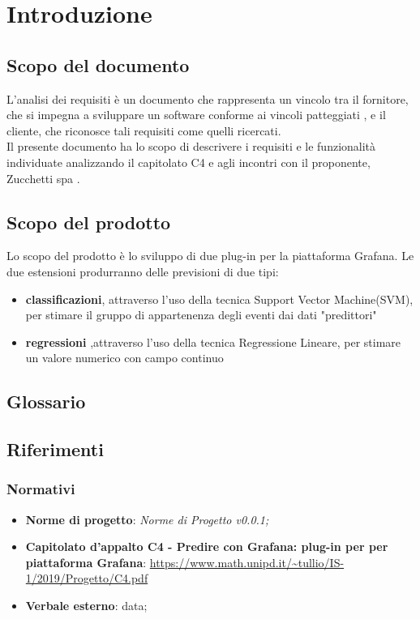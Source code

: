 \section{Introduzione}
	\subsection{Scopo del documento}
	L'analisi dei requisiti è un documento che rappresenta un vincolo tra il fornitore, che si impegna 		a sviluppare un software conforme ai vincoli patteggiati , e il cliente, che riconosce tali 			requisiti come quelli ricercati.
\\	Il presente documento ha lo scopo di descrivere i requisiti e le funzionalità individuate 			    analizzando il capitolato C4 e agli incontri con il proponente, Zucchetti spa .

	\subsection{Scopo del prodotto}
	Lo scopo del prodotto è lo sviluppo di due plug-in per la piattaforma Grafana. Le due estensioni     	produrranno delle previsioni di due tipi:
\\	
	\begin{itemize}
		\item \textbf {classificazioni}, attraverso l'uso della tecnica Support Vector Machine(SVM), per stimare il gruppo di appartenenza degli eventi dai dati "predittori"
		\item \textbf{regressioni} ,attraverso l'uso della tecnica Regressione Lineare, per stimare un valore numerico con campo continuo
	\end{itemize}
	
	\subsection{Glossario}
	
	\subsection{Riferimenti}
		\subsubsection{Normativi}
			\begin{itemize}
				\item \textbf{Norme di progetto}: \emph{Norme di Progetto v0.0.1;}
				\item \textbf{Capitolato d'appalto C4 - Predire con Grafana: plug-in per per piattaforma Grafana}: \url{https://www.math.unipd.it/~tullio/IS-1/2019/Progetto/C4.pdf}
				\item \textbf{Verbale esterno}: data; 
			\end{itemize}
		
